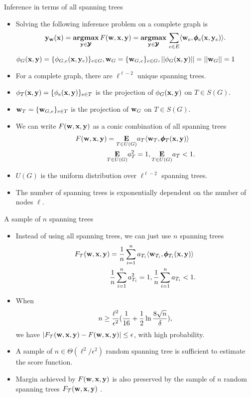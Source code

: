 \documentclass[first=dgreen,second=purple,logo=red]{aaltoslides}
\begin{document}
\begin{frame}{Inference in terms of all spanning trees}
	\begin{itemize}
		\item Solving the following inference problem on a complete graph is \nphard
		\begin{align*}
			\mathbf {y}_{\mathbf {w}}(\mathbf {x}) = \underset{\mathbf {y}\in\pmb {\mathcal{Y}}}{\textbf{argmax}}\,F(\mathbf {w},\mathbf {x},\mathbf {y})  = \underset{\mathbf {y}\in\pmb {\mathcal{Y}}}{\textbf{argmax}}\,\sum_{e\in E}\langle \mathbf {w}_e, \pmb \phi_e(\mathbf {x},\mathbf {y}_e) \rangle. 
		\end{align*}
		$\phi_G(\mathbf {x},\mathbf {y}) = \{\phi_{G,e}(\mathbf {x},\mathbf {y}_e)\}_{e\in G},\mathbf {w}_G = \{\mathbf {w}_{G,e}\}_{e\in G},||\phi_G(\mathbf {x},\mathbf {y})||=||\mathbf {w}_{G}||=1$
		\item For a complete graph, there are $\ell^{\ell-2}$ unique spanning trees.
		\item $\phi_T(\mathbf {x},\mathbf {y})=\{\phi_e(\mathbf {x},\mathbf {y})\}_{e\in T}$ is the projection of $\phi_G(\mathbf {x},\mathbf {y})$ on $T\in S(G)$.
		\item $\mathbf {w}_{T}=\{\mathbf {w}_{G,e}\}_{e\in T}$ is the projection of $\mathbf {w}_G$ on $T\in S(G)$.
		\item We can write $F(\mathbf {w},\mathbf {x},\mathbf {y})$ as a conic combination of all spanning trees
		\begin{align*}
			F(\mathbf {w},\mathbf {x},\mathbf {y}) &= \underset{T\in U(G)}{\textbf{E}}a_T\langle \mathbf {w}_T, \pmb \phi_T(\mathbf {x},\mathbf {y}) \rangle\\
			  &\underset{T\in U(G)}{\textbf{E}}a_T^2=1,  \underset{T\in U(G)}{\textbf{E}}a_T<1.
		\end{align*}
		\item $U(G)$ is the uniform distribution over $\ell^{\ell-2}$ spanning trees.
		\item The number of spanning trees is exponentially dependent on the number of nodes $\ell$.
	\end{itemize}
\end{frame}

%
\begin{frame}{A sample of $n$ spanning trees}
	\begin{itemize}\footnotesize
		\item Instead of using all spanning trees, we can just use $n$ spanning trees
		\begin{align*}\footnotesize
			F_{\mathcal{T}}(\mathbf {w},\mathbf {x},\mathbf {y}) &= \frac{1}{n}\sum_{i=1}^{n}a_{T_i}\langle \mathbf {w}_{T_i}, \pmb \phi_{T_i}(\mathbf {x},\mathbf {y}) \rangle\\
			  &\frac{1}{n}\sum_{i=1}^{n}a_{T_i}^2=1,  \frac{1}{n}\sum_{i=1}^{n}a_{T_i}<1.
		\end{align*}
		\item When
		\begin{align*}\footnotesize
			n\ge\frac{\ell^2}{\epsilon^2}(\frac{1}{16}+\frac{1}{2}\ln\frac{8\sqrt{n}}{\delta}),
		\end{align*}
		we have $|F_{\mathcal{T}}(\mathbf {w},\mathbf {x},\mathbf {y})-F(\mathbf {w},\mathbf {x},\mathbf {y})|\le\epsilon$, with high probability.
		\item A sample of $n\in\Theta(\ell^2/\epsilon^2)$ random spanning tree is sufficient to estimate the score function.
		\item Margin achieved by $F(\mathbf {w},\mathbf {x},\mathbf {y})$ is also preserved by the sample of $n$ random spanning trees $F_{\mathcal{T}}(\mathbf {w},\mathbf {x},\mathbf {y})$ \cite{su14multilabelnips}.
	\end{itemize}
\end{frame}
\end{document}
